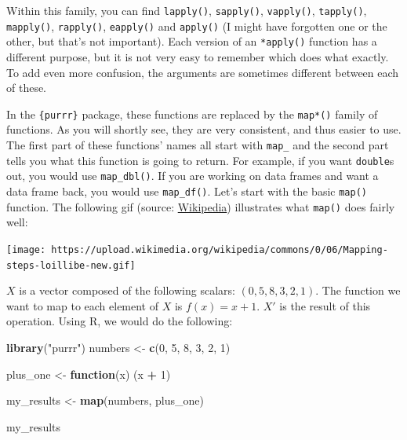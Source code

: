 \documentclass[]{gitbook}
\newenvironment{Shaded}{\begin{snugshade}}{\end{snugshade}}
\newcommand{\ControlFlowTok}[1]{\textcolor[rgb]{0.13,0.29,0.53}{\textbf{#1}}}
\newcommand{\DecValTok}[1]{\textcolor[rgb]{0.00,0.00,0.81}{#1}}
\newcommand{\KeywordTok}[1]{\textcolor[rgb]{0.13,0.29,0.53}{\textbf{#1}}}
\newcommand{\NormalTok}[1]{#1}
\newcommand{\OperatorTok}[1]{\textcolor[rgb]{0.81,0.36,0.00}{\textbf{#1}}}
\newcommand{\StringTok}[1]{\textcolor[rgb]{0.31,0.60,0.02}{#1}}
\begin{document}
Within this family, you can find \texttt{lapply()}, \texttt{sapply()}, \texttt{vapply()}, \texttt{tapply()}, \texttt{mapply()}, \texttt{rapply()},
\texttt{eapply()} and \texttt{apply()} (I might have forgotten one or the other, but that's not important).
Each version of an \texttt{*apply()} function has a different purpose, but it is not very easy to
remember which does what exactly. To add even more confusion, the arguments are sometimes different between
each of these.

In the \texttt{\{purrr\}} package, these functions are replaced by the \texttt{map*()} family of functions. As you will
shortly see, they are very consistent, and thus easier to use.
The first part of these functions' names all start
with \texttt{map\_} and the second part tells you what this function is going to return. For example, if
you want \texttt{double}s out, you would use \texttt{map\_dbl()}. If you are working on data frames and want a data
frame back, you would use \texttt{map\_df()}. Let's start with the basic \texttt{map()} function. The following
gif (source: \href{https://en.wikipedia.org/wiki/Map_(higher-order_function)}{Wikipedia}) illustrates
what \texttt{map()} does fairly well:

\texttt{[image: https://upload.wikimedia.org/wikipedia/commons/0/06/Mapping-steps-loillibe-new.gif]}

\(X\) is a vector composed of the following scalars: \((0, 5, 8, 3, 2, 1)\). The function we want to
map to each element of \(X\) is \(f(x) = x + 1\). \(X'\) is the result of this operation. Using R, we
would do the following:

\begin{Shaded}
\begin{Highlighting}[]
\KeywordTok{library}\NormalTok{(}\StringTok{"purrr"}\NormalTok{)}
\NormalTok{numbers <-}\StringTok{ }\KeywordTok{c}\NormalTok{(}\DecValTok{0}\NormalTok{, }\DecValTok{5}\NormalTok{, }\DecValTok{8}\NormalTok{, }\DecValTok{3}\NormalTok{, }\DecValTok{2}\NormalTok{, }\DecValTok{1}\NormalTok{)}

\NormalTok{plus_one <-}\StringTok{ }\ControlFlowTok{function}\NormalTok{(x) (x }\OperatorTok{+}\StringTok{ }\DecValTok{1}\NormalTok{)}

\NormalTok{my_results <-}\StringTok{ }\KeywordTok{map}\NormalTok{(numbers, plus_one)}

\NormalTok{my_results}
\end{Highlighting}
\end{Shaded}
\end{document}
